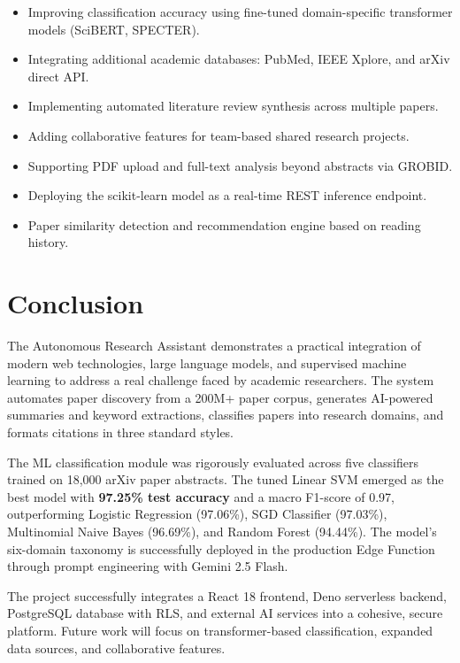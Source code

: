 \documentclass[12pt,a4paper]{article}
\begin{document}
\begin{itemize}[leftmargin=1.5cm]
  \item Improving classification accuracy using fine-tuned domain-specific transformer models (SciBERT, SPECTER).
  \item Integrating additional academic databases: PubMed, IEEE Xplore, and arXiv direct API.
  \item Implementing automated literature review synthesis across multiple papers.
  \item Adding collaborative features for team-based shared research projects.
  \item Supporting PDF upload and full-text analysis beyond abstracts via GROBID.
  \item Deploying the scikit-learn model as a real-time REST inference endpoint.
  \item Paper similarity detection and recommendation engine based on reading history.
\end{itemize}

\section{Conclusion}

The Autonomous Research Assistant demonstrates a practical integration of modern web technologies, large language models, and supervised machine learning to address a real challenge faced by academic researchers. The system automates paper discovery from a 200M+ paper corpus, generates AI-powered summaries and keyword extractions, classifies papers into research domains, and formats citations in three standard styles.

The ML classification module was rigorously evaluated across five classifiers trained on 18,000 arXiv paper abstracts. The tuned Linear SVM emerged as the best model with \textbf{97.25\% test accuracy} and a macro F1-score of 0.97, outperforming Logistic Regression (97.06\%), SGD Classifier (97.03\%), Multinomial Naive Bayes (96.69\%), and Random Forest (94.44\%). The model's six-domain taxonomy is successfully deployed in the production Edge Function through prompt engineering with Gemini 2.5 Flash.

The project successfully integrates a React 18 frontend, Deno serverless backend, PostgreSQL database with RLS, and external AI services into a cohesive, secure platform. Future work will focus on transformer-based classification, expanded data sources, and collaborative features.
\end{document}
